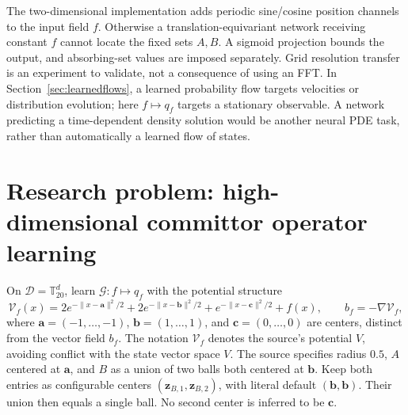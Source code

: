 \documentclass[12pt,a4paper,oneside]{book}
\begin{document}
The two-dimensional implementation adds periodic sine/cosine position channels to the input field $f$. Otherwise a
translation-equivariant network receiving constant $f$ cannot locate the fixed sets $A,B$. A sigmoid projection bounds
the output, and absorbing-set values are imposed separately. Grid resolution transfer is an experiment to validate,
not a consequence of using an FFT. In Section~\ref{sec:learnedflows}, a learned probability flow targets velocities
or distribution evolution; here $f\mapsto q_f$ targets a stationary observable. A network predicting a time-dependent
density solution would be another neural PDE task, rather than automatically a learned flow of states.

\section[High-dimensional committor operator learning]{Research problem: high-dimensional committor operator learning}
\label{subsec:neural-project3}
\label{src:p3main}

\begin{Question}
On $\mathcal D=\mathbb T_{20}^d$, learn $\boxed{\mathcal G:f\mapsto q_f}$ with the potential structure
\begin{equation}
 \mathcal V_f(x)=2e^{-\|x-\boldsymbol a\|^2/2}
 +2e^{-\|x-\boldsymbol b\|^2/2}+e^{-\|x-\boldsymbol c\|^2/2}+f(x),
 \qquad b_f=-\nabla\mathcal V_f,
 \label{eq:neural-potential}
\end{equation}
where $\boldsymbol a=(-1,\ldots,-1)$, $\boldsymbol b=(1,\ldots,1)$, and $\boldsymbol c=(0,\ldots,0)$ are centers,
distinct from the vector field $b_f$. The notation $\mathcal V_f$ denotes the source's potential $V$, avoiding conflict
with the state vector space $V$. The source specifies radius $0.5$, $A$ centered at $\boldsymbol a$, and $B$ as a
union of two balls both centered at $\boldsymbol b$. Keep both entries as configurable centers
$(\boldsymbol z_{B,1},\boldsymbol z_{B,2})$, with literal default $(\boldsymbol b,\boldsymbol b)$.
Their union then equals a single ball. No second center is inferred to be $\boldsymbol c$.
\end{Question}
\end{document}
